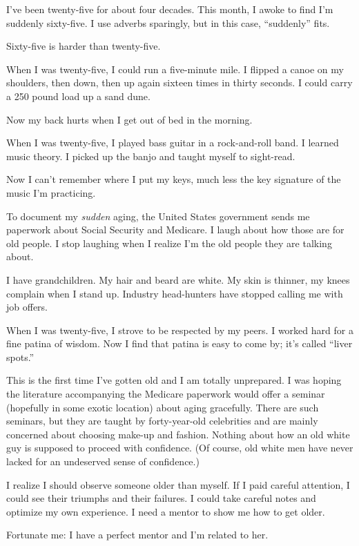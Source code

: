 \documentclass[
  letterpaper,
  DIV=11,
  numbers=noendperiod]{scrreprt}
\begin{document}

I've been twenty-five for about four decades. This month, I awoke to
find I'm suddenly sixty-five. I use adverbs sparingly, but in this case,
``suddenly'' fits.

Sixty-five is harder than twenty-five.

When I was twenty-five, I could run a five-minute mile. I flipped a
canoe on my shoulders, then down, then up again sixteen times in thirty
seconds. I could carry a 250 pound load up a sand dune.

Now my back hurts when I get out of bed in the morning.

When I was twenty-five, I played bass guitar in a rock-and-roll band. I
learned music theory. I picked up the banjo and taught myself to
sight-read.

Now I can't remember where I put my keys, much less the key signature of
the music I'm practicing.

To document my \emph{sudden} aging, the United States government sends
me paperwork about Social Security and Medicare. I laugh about how those
are for old people. I stop laughing when I realize I'm the old people
they are talking about.

I have grandchildren. My hair and beard are white. My skin is thinner,
my knees complain when I stand up. Industry head-hunters have stopped
calling me with job offers.

When I was twenty-five, I strove to be respected by my peers. I worked
hard for a fine patina of wisdom. Now I find that patina is easy to come
by; it's called ``liver spots.''

This is the first time I've gotten old and I am totally unprepared. I
was hoping the literature accompanying the Medicare paperwork would
offer a seminar (hopefully in some exotic location) about aging
gracefully. There are such seminars, but they are taught by
forty-year-old celebrities and are mainly concerned about choosing
make-up and fashion. Nothing about how an old white guy is supposed to
proceed with confidence. (Of course, old white men have never lacked for
an undeserved sense of confidence.)

I realize I should observe someone older than myself. If I paid careful
attention, I could see their triumphs and their failures. I could take
careful notes and optimize my own experience. I need a mentor to show me
how to get older.

Fortunate me: I have a perfect mentor and I'm related to her.
\end{document}
